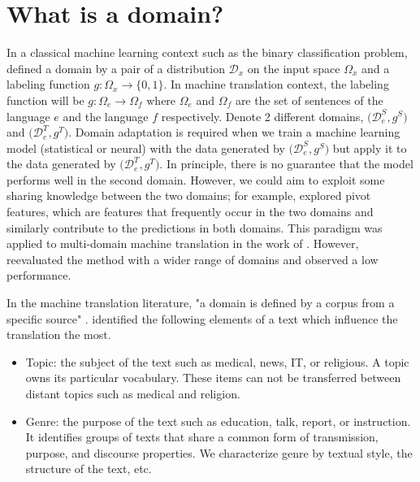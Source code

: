\section{What is a domain?}
\label{sec:domain}
In a classical machine learning context such as the binary classification problem, \citet{Shai10A} defined a domain by a pair of a distribution $\mathcal{D}_x$ on the input space $\Omega_x$ and a labeling function $g: \Omega_{x} \rightarrow \{ 0,1 \}$. In machine translation context, the labeling function will be $g: \Omega_{e} \rightarrow \Omega_{f}$ where $\Omega_{e}$ and $\Omega_{f}$ are the set of sentences of the language $e$ and the language $f$ respectively. Denote 2 different domains, $\big( \mathcal{D}_e^S, g^S \big)$ and $\big( \mathcal{D}_e^T, g^T \big)$. Domain adaptation is required when we train a machine learning model (statistical or neural) with the data generated by $\big(\mathcal{D}_e^S, g^S \big)$ but apply it to the data generated by $\big(\mathcal{D}_e^T, g^T \big)$. In principle, there is no guarantee that the model performs well in the second domain. However, we could aim to exploit some sharing knowledge between the two domains; for example, \citet{Blitzer06Domain,Miller19simplified} explored pivot features, which are features that frequently occur in the two domains and similarly contribute to the predictions in both domains. This paradigm was applied to multi-domain machine translation in the work of \citet{Britz17effective}. However, \citet{Pham21revisiting} reevaluated the method with a wider range of domains and observed a low performance.

In the machine translation literature, "a domain is defined by a corpus from a specific source" \citep{koehn17six}. \citet{Wees15Whats,Wees17Whats} identified the following elements of a text which influence the translation the most.
\begin{itemize}
	\item Topic: the subject of the text such as medical, news, IT, or religious. A topic owns its particular vocabulary. These items can not be transferred between distant topics such as medical and religion.
	\item Genre: the purpose of the text such as education, talk, report, or instruction. It identifies groups of texts that share a common form of transmission, purpose, and discourse properties. We characterize genre by textual style, the structure of the text, etc.
\end{itemize}

